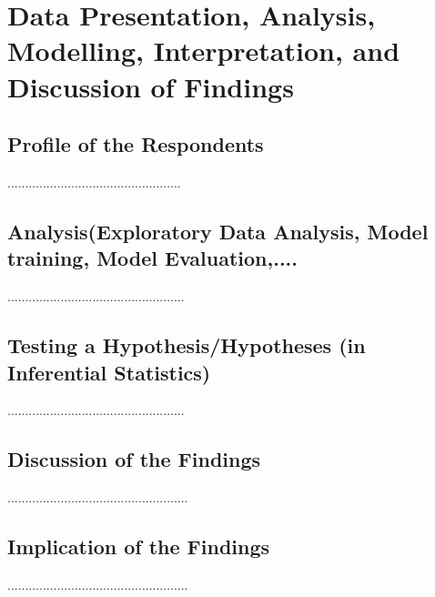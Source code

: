 
\section{Data Presentation, Analysis, Modelling, Interpretation, and Discussion of Findings} %






\subsection{Profile of the Respondents}
.................................................
\subsection{Analysis(Exploratory Data Analysis, Model training, Model Evaluation,....}
..................................................
\subsection{Testing a Hypothesis/Hypotheses (in Inferential Statistics)}
..................................................
\subsection{Discussion of the Findings}
...................................................
\subsection{Implication of the Findings}
...................................................
